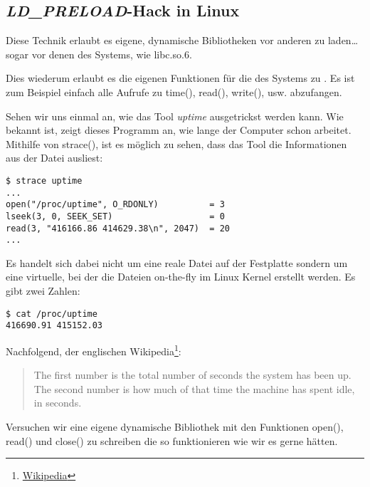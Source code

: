 \subsection{\emph{LD\_PRELOAD}-Hack in Linux}

\label{ld_preload}

Diese Technik erlaubt es eigene, dynamische Bibliotheken vor anderen zu laden\dots{}
sogar vor denen des Systems, wie libc.so.6.

Dies wiederum erlaubt es die eigenen Funktionen für die des Systems zu .
Es ist zum Beispiel einfach alle Aufrufe zu time(), read(), write(), usw. abzufangen.

Sehen wir uns einmal an, wie das Tool \emph{uptime} ausgetrickst werden kann.
Wie bekannt ist, zeigt dieses Programm an, wie lange der Computer schon arbeitet.
Mithilfe von strace(), ist es möglich zu sehen, dass das Tool die
Informationen aus der Datei  ausliest:

\begin{lstlisting}
$ strace uptime 
...
open("/proc/uptime", O_RDONLY)          = 3
lseek(3, 0, SEEK_SET)                   = 0
read(3, "416166.86 414629.38\n", 2047)  = 20
...
\end{lstlisting}

Es handelt sich dabei nicht um eine reale Datei auf der Festplatte sondern um eine
virtuelle, bei der die Dateien on-the-fly im Linux Kernel erstellt werden.
Es gibt zwei Zahlen:

\begin{lstlisting}
$ cat /proc/uptime
416690.91 415152.03
\end{lstlisting}

Nachfolgend, der englischen Wikipedia\footnote{\href{http://go.yurichev.com/17043}{Wikipedia}}:

\begin{framed}
\begin{quotation}
The first number is the total number of seconds the system has been up.
The second number is how much of that time the machine has spent idle, in seconds.
\end{quotation}
\end{framed}


Versuchen wir eine eigene dynamische Bibliothek mit den Funktionen open(), read()
und close() zu schreiben die so funktionieren wie wir es gerne hätten.

